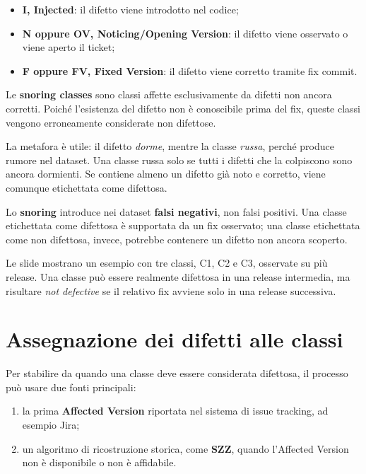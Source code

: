 \begin{itemize}
    \item \textbf{I, Injected}: il difetto viene introdotto nel codice;
    \item \textbf{N oppure OV, Noticing/Opening Version}: il difetto viene osservato o viene aperto il ticket;
    \item \textbf{F oppure FV, Fixed Version}: il difetto viene corretto tramite fix commit.
\end{itemize}

Le \textbf{snoring classes} sono classi affette esclusivamente da difetti non ancora corretti. Poiché l'esistenza del difetto non è conoscibile prima del fix, queste classi vengono erroneamente considerate non difettose.

\begin{notaprof}
La metafora è utile: il difetto \emph{dorme}, mentre la classe \emph{russa}, perché produce rumore nel dataset. Una classe russa solo se tutti i difetti che la colpiscono sono ancora dormienti. Se contiene almeno un difetto già noto e corretto, viene comunque etichettata come difettosa.
\end{notaprof}

\begin{notaesame}
Lo \textbf{snoring} introduce nei dataset \textbf{falsi negativi}, non falsi positivi. Una classe etichettata come difettosa è supportata da un fix osservato; una classe etichettata come non difettosa, invece, potrebbe contenere un difetto non ancora scoperto.
\end{notaesame}

\begin{notaslide}
Le slide mostrano un esempio con tre classi, C1, C2 e C3, osservate su più release. Una classe può essere realmente difettosa in una release intermedia, ma risultare \emph{not defective} se il relativo fix avviene solo in una release successiva.
\end{notaslide}

\section{Assegnazione dei difetti alle classi}

Per stabilire da quando una classe deve essere considerata difettosa, il processo può usare due fonti principali:

\begin{enumerate}
    \item la prima \textbf{Affected Version} riportata nel sistema di issue tracking, ad esempio Jira;
    \item un algoritmo di ricostruzione storica, come \textbf{SZZ}, quando l'Affected Version non è disponibile o non è affidabile.
\end{enumerate}

